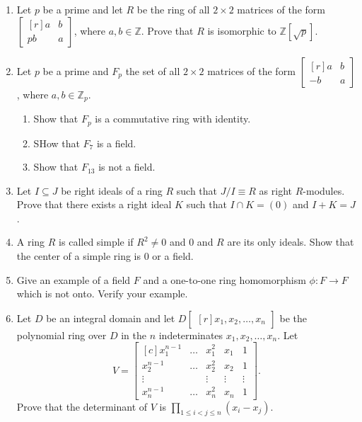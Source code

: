 \documentclass{article}
\theoremstyle{definition}
\newcommand{\Z}{\mathbb{Z}}
\newcommand{\mat}[1]{\begin{bmatrix*}[r] #1 \end{bmatrix*}}
\newcommand{\x}{\times}
\begin{document}
\begin{enumerate}
            \item Let $p$ be a prime and let $R$ be the ring of all $2\times 2$ matrices of the form $\mat{a&b\\pb&a}$, where $a,b\in \Z$. Prove that $R$ is isomorphic to $\Z[\sqrt{p}]$.
            
            \item Let $p$ be a prime and $F_p$ the set of all $2\x 2$ matrices of the form $\mat{a&b\\-b&a}$, where $a,b\in \Z_p$.
            
            \begin{enumerate}
                \item Show that $F_p$ is a commutative ring with identity.
                \item SHow that $F_7$ is a field.
                \item Show that $F_{13}$ is not a field.
            \end{enumerate}

            \item Let $I\subseteq J$ be right ideals of a ring $R$ such that $J/I \equiv R$ as right $R$-modules. Prove that there exists a right ideal $K$ such that $I\cap K=(0)$ and $I+K=J$.
            
            \item A ring $R$ is called simple if $R^2 \neq 0$ and $0$ and $R$ are its only ideals. Show that the center of a simple ring is $0$ or a field. 
            
            \item Give an example of a field $F$ and a one-to-one ring homomorphism $\phi : F\to F$ which is not onto. Verify your example.
            
            \item Let $D$ be an integral domain and let $D\mat{x_1, x_2, \hdots,  x_n}$ be the polynomial ring over $D$ in the $n$ indeterminates $x_1, x_2, \hdots, x_n$. Let \[V=\begin{bmatrix*}[c] x^{n-1}_1 & \hdots & x^2_1 & x_1 & 1 \\ x^{n-1}_2 & \hdots & x^2_2 & x_2 & 1 \\ \vdots & & \vdots & \vdots & \vdots \\ x^{n-1}_n & \hdots & x^2_n & x_n & 1 \end{bmatrix*}.\]  Prove that the determinant of $V$ is $\prod_{1\leq i <j \leq n} (x_i-x_j)$.
            

\end{enumerate}
\end{document}
